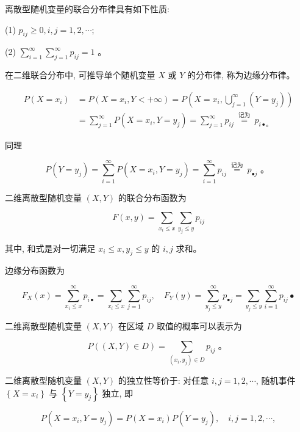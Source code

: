 \documentclass{beamer}
\begin{document}
	\begin{frame}
		离散型随机变量的联合分布律具有如下性质:
		
		(1) $p_{i j} \geqslant 0, i, j=1,2, \cdots$;
		
		(2) $\sum_{i=1}^{\infty} \sum_{j=1}^{\infty} p_{i j}=1$ 。
		
	\end{frame}
	
	\begin{frame}
		在二维联合分布中, 可推导单个随机变量 $X$ 或 $Y$ 的分布律, 称为边缘分布律。
		
		$$
		\begin{aligned}
			P\left(X=x_{i}\right) & =P\left(X=x_{i}, Y<+\infty\right)=P\left(X=x_{i}, \bigcup_{j=1}^{\infty}\left(Y=y_{j}\right)\right) \\
			& =\sum_{j=1}^{\infty} P\left(X=x_{i}, Y=y_{j}\right)=\sum_{j=1}^{\infty} p_{i j} \stackrel{\text { 记为 }}{=} p_{i \bullet 。}
		\end{aligned}
		$$
		
		同理
		
		$$
		P\left(Y=y_{j}\right)=\sum_{i=1}^{\infty} P\left(X=x_{i}, Y=y_{j}\right)=\sum_{i=1}^{\infty} p_{i j} \stackrel{\text { 记为 }}{=} p_{\bullet j} \text { 。 }
		$$
	\end{frame}
	
	\begin{frame}
		二维离散型随机变量 $(X, Y)$ 的联合分布函数为
		
		$$
		F(x, y)=\sum_{x_{i} \leqslant x} \sum_{y_{j} \leqslant y} p_{i j}
		$$
		
		其中, 和式是对一切满足 $x_{i} \leqslant x, y_{j} \leqslant y$ 的 $i, j$ 求和。
		
		边缘分布函数为
		
		$$
		F_{X}(x)=\sum_{x_{i} \leqslant x}^{\infty} p_{i \bullet}=\sum_{x_{i} \leqslant x} \sum_{j=1}^{\infty} p_{i j}, \quad F_{Y}(y)=\sum_{y_{j} \leqslant y}^{\infty} p_{\bullet j}=\sum_{y_{j} \leqslant y} \sum_{i=1}^{\infty} p_{i j} \bullet
		$$
		
		二维离散型随机变量 $(X, Y)$ 在区域 $D$ 取值的概率可以表示为
		
		$$
		P((X, Y) \in D)=\sum_{\left(x_{i}, y_{j}\right) \in D} p_{i j} \text { 。 }
		$$
		
		二维离散型随机变量 $(X, Y)$ 的独立性等价于: 对任意 $i, j=1,2, \cdots$, 随机事件 $\left\{X=x_{i}\right\}$ 与 $\left\{Y=y_{j}\right\}$ 独立, 即
		
		$$
		P\left(X=x_{i}, Y=y_{j}\right)=P\left(X=x_{i}\right) P\left(Y=y_{j}\right), \quad i, j=1,2, \cdots,
		$$
		
		
	\end{frame}
	
\end{document}
